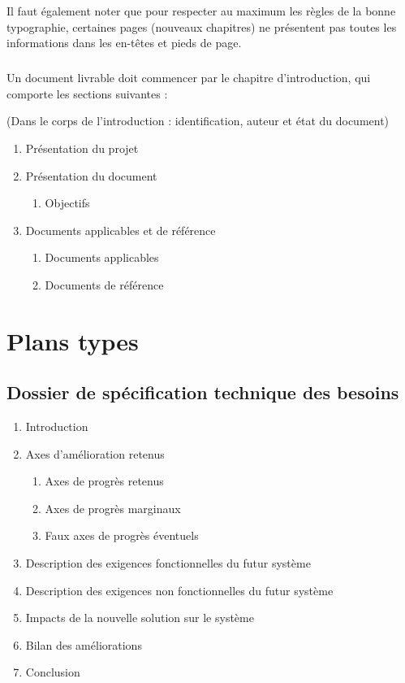 Il faut également noter que pour respecter au maximum les règles de la bonne typographie, certaines pages (nouveaux chapitres) ne présentent pas toutes les informations dans les en-têtes et pieds de page.

\paragraph{}
Un document livrable doit commencer par le chapitre d'introduction, qui comporte les sections suivantes : 

(Dans le corps de l'introduction : identification, auteur et état du document)
\begin{enumerate}
\item Présentation du projet
\item Présentation du document
\begin{enumerate}
\item Objectifs
\end{enumerate}
\item{Documents applicables et de référence}
\begin{enumerate}
\item Documents applicables
\item Documents de référence
\end{enumerate}
\end{enumerate}

\chapter{Plans types}

\label{chapter:plans_types}

\section[STB]{Dossier de spécification technique des besoins}

\begin{enumerate}
\item{Introduction}
\item{Axes d'amélioration retenus}
\begin{enumerate}
\item{Axes de progrès retenus}
\item{Axes de progrès marginaux}
\item{Faux axes de progrès éventuels}
\end{enumerate}
\item{Description des exigences fonctionnelles du futur système}
\item{Description des exigences non fonctionnelles du futur système}
\item{Impacts de la nouvelle solution sur le système}
\item{Bilan des améliorations}
\item{Conclusion}
\end{enumerate}

